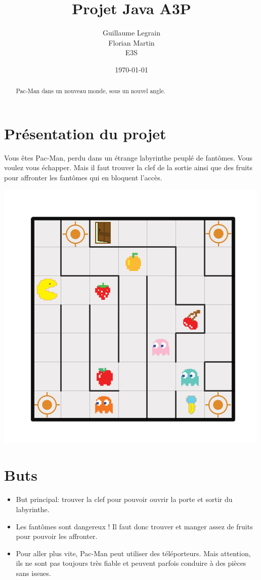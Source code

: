 \documentclass[twoside,french]{article}
\begin{document}

\title{Projet Java A3P}
\date{\today}
\author{Guillaume Legrain \\
        Florian Martin \\
        E3S}
\maketitle
\begin{abstract}
Pac-Man dans un nouveau monde, sous un nouvel angle.\vspace{-2ex}
\end{abstract}

\section{Présentation du projet}
Vous êtes Pac-Man, perdu dans un étrange labyrinthe peuplé de fantômes. Vous voulez vous échapper.
Mais il faut trouver la clef de la sortie ainsi que des fruits pour affronter les fantômes qui en
bloquent l’accès.

\includegraphics[scale=0.8]{graphics/Plan-Projet-1.png}

\section{Buts}
   \begin{itemize}
      \item But principal: trouver la clef pour pouvoir ouvrir la porte et sortir du labyrinthe.
      \item Les fantômes sont dangereux ! Il faut donc trouver et manger assez de fruits pour
      pouvoir les affronter.
      \item Pour aller plus vite, Pac-Man peut utiliser des téléporteurs. Mais attention, ils ne 
      sont pas toujours très fiable et peuvent parfois conduire à des pièces sans issues.
   \end{itemize}
\end{document}

